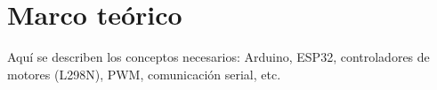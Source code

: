 \section{Marco teórico}

Aquí se describen los conceptos necesarios: Arduino, ESP32,
controladores de motores (L298N), PWM, comunicación serial, etc.
